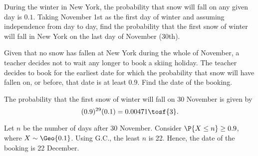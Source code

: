 \begin{problem}
    During the winter in New York, the probability that snow will fall on any given day is $0.1$. Taking November 1st as the first day of winter and assuming independence from day to day, find the probability that the first snow of winter will fall in New York on the last day of November (30th).

    Given that no snow has fallen at New York during the whole of November, a teacher decides not to wait any longer to book a skiing holiday. The teacher decides to book for the earliest date for which the probability that snow will have fallen on, or before, that date is at least $0.9$. Find the date of the booking.
\end{problem}
\begin{solution}
    The probability that the first snow of winter will fall on 30 November is given by \[(0.9)^{29} (0.1) = 0.00471 \tosf{3}.\]

    Let $n$ be the number of days after 30 November. Consider $\P{X \leq n} \geq 0.9$, where $X \sim \Geo{0.1}$. Using G.C., the least $n$ is 22. Hence, the date of the booking is 22 December.
\end{solution}

